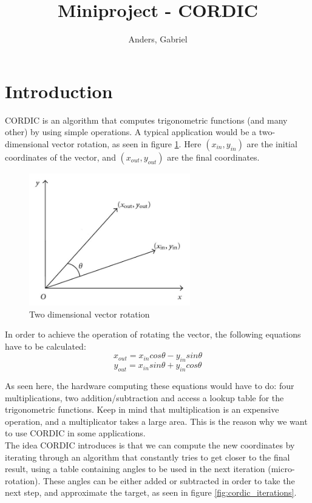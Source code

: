 \documentclass[12pt, a4paper,oneside]{article}
\title{Miniproject - CORDIC}
\author{Anders, Gabriel}
\begin{document}
\maketitle

\section{Introduction}
CORDIC is an algorithm that computes trigonometric functions (and many other)
by using simple operations.
A typical application would be a two-dimensional vector rotation, as seen in 
figure \ref{fig:two_vector}. Here $(x_{in}, y_{in})$ are the initial coordinates
of the vector, and $(x_{out}, y_{out})$ are the final coordinates.

\begin{figure}[h]
	\centering
	\includegraphics[width = 7cm]{two_vector.jpg}
	\caption{Two dimensional vector rotation}
	\label{fig:two_vector}
\end{figure}

In order to achieve the operation of rotating the vector, the following equations
have to be calculated:
\[ x_{out} = x_{in} cos\theta - y_{in} sin\theta \]
\[ y_{out} = x_{in} sin\theta + y_{in} cos\theta \]

As seen here, the hardware computing these equations would have to do:
four multiplications, two addition/subtraction 
and access a lookup table for the trigonometric functions\cite{cordic1}.
Keep in mind that multiplication is an expensive operation, and a multiplicator
takes a large area. This is the reason why we want to use CORDIC in some 
applications.
\\

The idea CORDIC introduces is that we can compute the new coordinates by 
iterating through an algorithm that constantly tries to get closer to the 
final result, using a table containing angles to be used in the next iteration
(micro-rotation). These angles can be either added or subtracted in order
to take the next step, and approximate the target, as seen in figure \ref{fig:cordic_iterations}.
\end{document}
